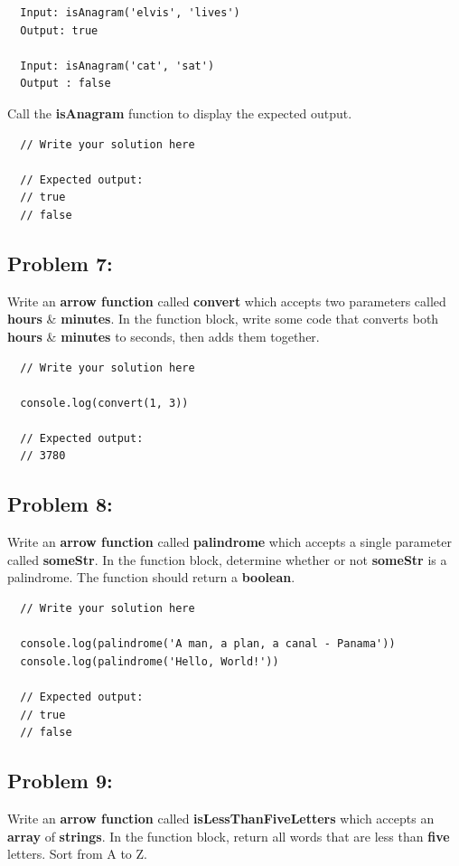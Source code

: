 \documentclass{article}
\begin{document}
\begin{verbatim}
  Input: isAnagram('elvis', 'lives')
  Output: true

  Input: isAnagram('cat', 'sat')
  Output : false
\end{verbatim}

Call the \textbf{isAnagram} function to display the expected output.

\begin{verbatim}
  // Write your solution here

  // Expected output:
  // true
  // false
\end{verbatim}

\subsection*{Problem 7:}
Write an \textbf{arrow function} called \textbf{convert} which accepts two parameters called \textbf{hours} \& \textbf{minutes}. In the function block, write some code that converts both \textbf{hours} \& \textbf{minutes} to seconds, then adds them together.

\begin{verbatim}
  // Write your solution here

  console.log(convert(1, 3))

  // Expected output:
  // 3780
\end{verbatim}

\subsection*{Problem 8:}
Write an \textbf{arrow function} called \textbf{palindrome} which accepts a single parameter called \textbf{someStr}. In the function block, determine whether or not \textbf{someStr} is a palindrome. The function should return a \textbf{boolean}.

\begin{verbatim}
  // Write your solution here

  console.log(palindrome('A man, a plan, a canal - Panama'))
  console.log(palindrome('Hello, World!'))

  // Expected output:
  // true
  // false
\end{verbatim}
 
\subsection*{Problem 9:}
Write an \textbf{arrow function} called \textbf{isLessThanFiveLetters} which accepts an \textbf{array} of \textbf{strings}. In the function block, return all words that are less than \textbf{five} letters. Sort from A to Z.
\end{document}

